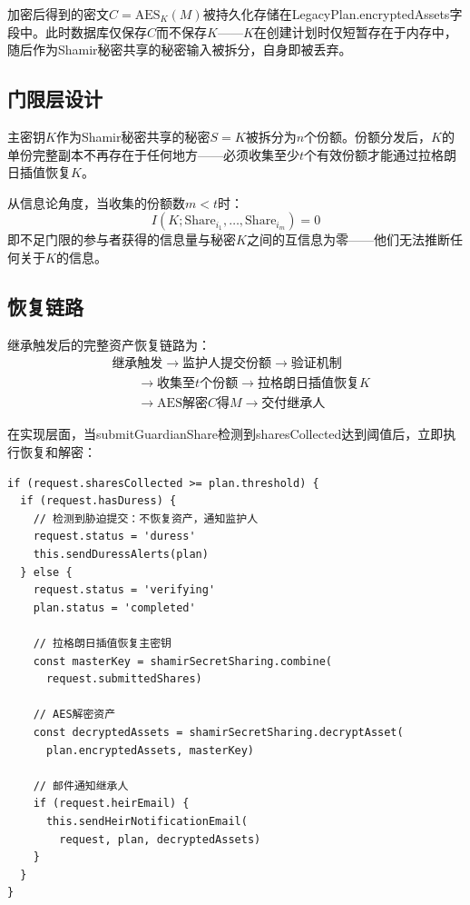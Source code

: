 \documentclass[UTF8,a4paper,zihao=-4,openany]{ctexrep}
\begin{document}
加密后得到的密文$C=\text{AES}_K(M)$被持久化存储在LegacyPlan.encryptedAssets字段中。此时数据库仅保存$C$而不保存$K$——$K$在创建计划时仅短暂存在于内存中，随后作为Shamir秘密共享的秘密输入被拆分，自身即被丢弃。

\subsection{门限层设计}

主密钥$K$作为Shamir秘密共享的秘密$S=K$被拆分为$n$个份额。份额分发后，$K$的单份完整副本不再存在于任何地方——必须收集至少$t$个有效份额才能通过拉格朗日插值恢复$K$。

从信息论角度，当收集的份额数$m<t$时：
\[
I(K; \text{Share}_{i_1}, \dots, \text{Share}_{i_m}) = 0
\]
即不足门限的参与者获得的信息量与秘密$K$之间的互信息为零——他们无法推断任何关于$K$的信息。

\subsection{恢复链路}

继承触发后的完整资产恢复链路为：
\[
\begin{aligned}
&\text{继承触发}\rightarrow\text{监护人提交份额}\rightarrow\text{验证机制}\\
&\qquad\rightarrow\text{收集至}t\text{个份额}\rightarrow\text{拉格朗日插值恢复}K\\
&\qquad\rightarrow\text{AES解密}C\text{得}M\rightarrow\text{交付继承人}
\end{aligned}
\]

在实现层面，当submitGuardianShare检测到sharesCollected达到阈值后，立即执行恢复和解密：

\begin{lstlisting}[caption={达到门限后的自动恢复 (legacyPlanService.ts:575-601, 节选)}]
if (request.sharesCollected >= plan.threshold) {
  if (request.hasDuress) {
    // 检测到胁迫提交：不恢复资产，通知监护人
    request.status = 'duress'
    this.sendDuressAlerts(plan)
  } else {
    request.status = 'verifying'
    plan.status = 'completed'

    // 拉格朗日插值恢复主密钥
    const masterKey = shamirSecretSharing.combine(
      request.submittedShares)

    // AES解密资产
    const decryptedAssets = shamirSecretSharing.decryptAsset(
      plan.encryptedAssets, masterKey)

    // 邮件通知继承人
    if (request.heirEmail) {
      this.sendHeirNotificationEmail(
        request, plan, decryptedAssets)
    }
  }
}
\end{lstlisting}
\end{document}
